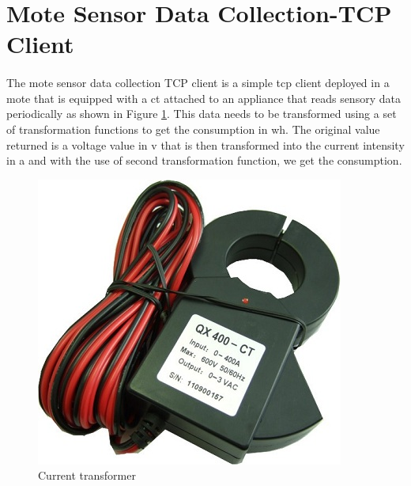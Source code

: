 \documentclass[12pt,a4paper,final]{report}
\begin{document}
\section{Mote Sensor Data Collection-TCP Client}
\paragraph{}
The mote sensor data collection TCP client is a simple \gls{tcp} client deployed in a mote that is equipped with a \gls{ct} attached to an appliance that reads sensory data periodically as shown in Figure \ref{fig:current_transformer}. This data needs to be transformed using a set of transformation functions to get the consumption in \gls{wh}. The original value returned is a voltage value in \gls{v} that is then transformed into the current intensity in \gls{a} and with the use of second transformation function, we get the consumption.

\begin{figure}[htbp]
\centering
\includegraphics[scale=0.7]{img/ct.jpg}
\caption{Current transformer}
\label{fig:current_transformer}
\end{figure}
\end{document}
